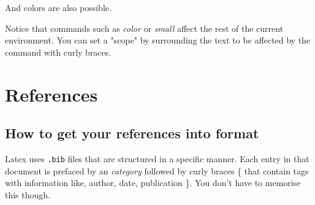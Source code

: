 \documentclass[12pt]{scrarticle}
\begin{document}
And {\color{blue}colors} {\color{red} are} {\color{cyan} also} possible.

Notice that commands such as \textit{color} or \textit{small} affect the rest of the current environment. You can set a "scope" by surrounding the text to be affected by the command with curly braces.

\section{References}

\subsection{How to get your references into format}
Latex uses \texttt{.bib} files that are structured in a specific manner. Each entry in that document is prefaced by an \@ \textit{category} followed by curly braces \{ that contain tags with information like, author, date, publication \}. You don't have to memorise this though.
\end{document}
